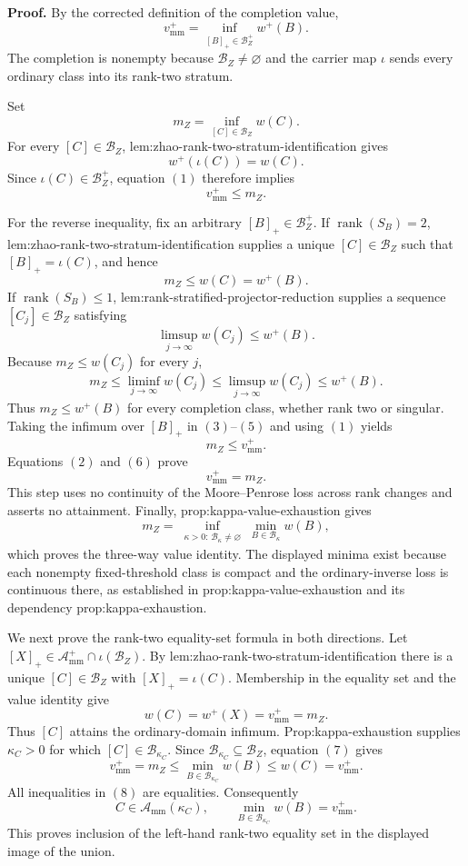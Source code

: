 \textbf{Proof.}
By the corrected definition of the completion value,
\[
v_{\mathrm{mm}}^+=\inf_{[B]_+\in\mathcal B_Z^+}w^+(B). \tag{1}
\]
The completion is nonempty because \(\mathcal B_Z\ne\varnothing\) and the carrier map \(\iota\) sends every ordinary class into its rank-two stratum.

Set
\[
m_Z=\inf_{[C]\in\mathcal B_Z}w(C).
\]
For every \([C]\in\mathcal B_Z\), lem:zhao-rank-two-stratum-identification gives
\[
w^+(\iota(C))=w(C).
\]
Since \(\iota(C)\in\mathcal B_Z^+\), equation \((1)\) therefore implies
\[
v_{\mathrm{mm}}^+\le m_Z. \tag{2}
\]

For the reverse inequality, fix an arbitrary \([B]_+\in\mathcal B_Z^+\).  If \(\operatorname{rank}(S_B)=2\), lem:zhao-rank-two-stratum-identification supplies a unique \([C]\in\mathcal B_Z\) such that \([B]_+=\iota(C)\), and hence
\[
m_Z\le w(C)=w^+(B). \tag{3}
\]
If \(\operatorname{rank}(S_B)\le1\), lem:rank-stratified-projector-reduction supplies a sequence \([C_j]\in\mathcal B_Z\) satisfying
\[
\limsup_{j\to\infty}w(C_j)\le w^+(B). \tag{4}
\]
Because \(m_Z\le w(C_j)\) for every \(j\),
\[
m_Z\le\liminf_{j\to\infty}w(C_j)
\le\limsup_{j\to\infty}w(C_j)
\le w^+(B). \tag{5}
\]
Thus \(m_Z\le w^+(B)\) for every completion class, whether rank two or singular.  Taking the infimum over \([B]_+\) in \((3)\)--\((5)\) and using \((1)\) yields
\[
m_Z\le v_{\mathrm{mm}}^+. \tag{6}
\]
Equations \((2)\) and \((6)\) prove
\[
v_{\mathrm{mm}}^+=m_Z.
\]
This step uses no continuity of the Moore--Penrose loss across rank changes and asserts no attainment.  Finally, prop:kappa-value-exhaustion gives
\[
m_Z
=\inf_{\substack{\kappa>0:\,\mathcal B_\kappa\ne\varnothing}}
\min_{B\in\mathcal B_\kappa}w(B),
\]
which proves the three-way value identity.  The displayed minima exist because each nonempty fixed-threshold class is compact and the ordinary-inverse loss is continuous there, as established in prop:kappa-value-exhaustion and its dependency prop:kappa-exhaustion.

We next prove the rank-two equality-set formula in both directions.  Let
\([X]_+\in\mathcal A_{\mathrm{mm}}^+\cap\iota(\mathcal B_Z)\).  By lem:zhao-rank-two-stratum-identification there is a unique \([C]\in\mathcal B_Z\) with \([X]_+=\iota(C)\).  Membership in the equality set and the value identity give
\[
w(C)=w^+(X)=v_{\mathrm{mm}}^+=m_Z. \tag{7}
\]
Thus \([C]\) attains the ordinary-domain infimum.  Prop:kappa-exhaustion supplies \(\kappa_C>0\) for which \([C]\in\mathcal B_{\kappa_C}\).  Since \(\mathcal B_{\kappa_C}\subseteq\mathcal B_Z\), equation \((7)\) gives
\[
v_{\mathrm{mm}}^+=m_Z
\le \min_{B\in\mathcal B_{\kappa_C}}w(B)
\le w(C)=v_{\mathrm{mm}}^+. \tag{8}
\]
All inequalities in \((8)\) are equalities.  Consequently
\[
C\in\mathcal A_{\mathrm{mm}}(\kappa_C),
\qquad
\min_{B\in\mathcal B_{\kappa_C}}w(B)=v_{\mathrm{mm}}^+.
\]
This proves inclusion of the left-hand rank-two equality set in the displayed image of the union.

